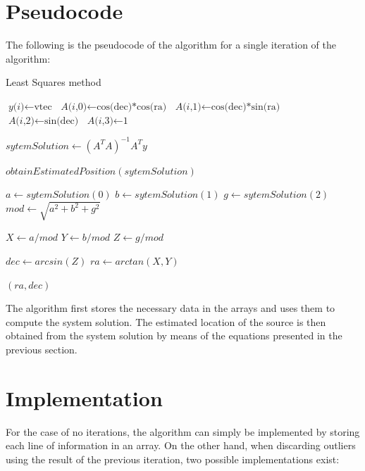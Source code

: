 \section{Pseudocode}

The following is the pseudocode of the algorithm for a single iteration of the algorithm:

\begin{algorithm}
	\caption{Least Squares method}\label{leastSquaresPseudo}
	\begin{algorithmic}[1]
		
		\State $\textit{y(i)} \gets \text{vtec}$
		\State $\textit{A(i,0)} \gets \text{cos(dec)*cos(ra)}$
		\State $\textit{A(i,1)} \gets \text{cos(dec)*sin(ra)}$
		\State $\textit{A(i,2)} \gets \text{sin(dec)}$
		\State $\textit{A(i,3)} \gets \text{1}$
		\EndFor
		
		\State $\textit{sytemSolution} \gets (A^{T}A)^{-1}A^{T}y$
		
		\Return $obtainEstimatedPosition(sytemSolution)$
		\EndProcedure

			\State $\textit{a} \gets sytemSolution(0)$
			\State $\textit{b} \gets sytemSolution(1)$
			\State $\textit{g} \gets sytemSolution(2)$
			\State $\textit{mod} \gets \sqrt{a^{2} + b^{2} + g^{2}}$ 
			
			
			\State $\textit{X} \gets a/mod$
			\State $\textit{Y} \gets b/mod$
			\State $\textit{Z} \gets g/mod$
			
			\State $\textit{dec} \gets arcsin(Z)$
			\State $\textit{ra} \gets arctan(X,Y)$
			
			\Return $(ra, dec)$
		\EndProcedure
	\end{algorithmic}
\end{algorithm}

The algorithm first stores the necessary data in the arrays and uses them to compute the system solution. The estimated location of the source is then obtained from the system solution by means of the equations presented in the previous section.

\clearpage

\section{Implementation}

For the case of no iterations, the algorithm can simply be implemented by storing each line of information in an array. On the other hand, when discarding outliers using the result of the previous iteration, two possible implementations exist:

